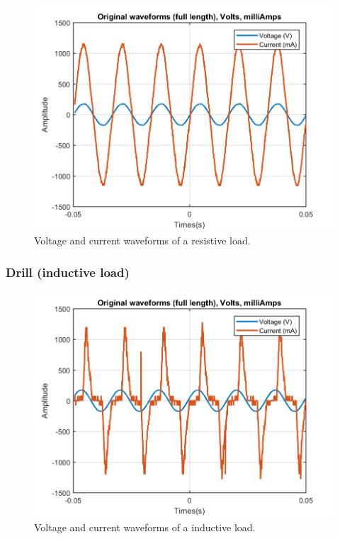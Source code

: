 \documentclass[journal]{IEEEtran}
\begin{document}
\begin{figure}[h]
\centering
\includegraphics[clip,width=\columnwidth]{original_waveform_cautin.png}
\caption{Voltage and current waveforms of a resistive load.}
\label{original_resistive_load}
\end{figure}




\subsubsection{Drill (inductive load)}

\begin{figure}[h]
\centering
\includegraphics[clip,width=\columnwidth]{original_waveform_drill.png}
\caption{Voltage and current waveforms of a inductive load.}
\label{original_inductive_load}
\end{figure}
\end{document}
